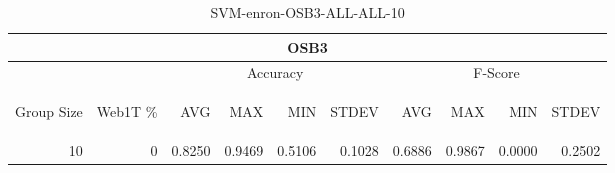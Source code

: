 \begin{center}
\begin{table}[htbp] 
 \begin{center}
\begin{tabular}{ | r | r | r | r | r | r | r | r | r | r |}
\hline
\multicolumn{10}{|c|}{OSB3}\\
\hline
 & & \multicolumn{4}{|c|}{Accuracy} & \multicolumn{4}{|c|}{F-Score}\\ \cline{3-10}
\begin{sideways}Group Size\end{sideways} & \begin{sideways}Web1T \%\end{sideways} & \begin{sideways}AVG\end{sideways} & \begin{sideways}MAX\end{sideways} & \begin{sideways}MIN\end{sideways} & \begin{sideways}STDEV\end{sideways} & \begin{sideways}AVG\end{sideways} & \begin{sideways}MAX\end{sideways} & \begin{sideways}MIN\end{sideways} & \begin{sideways}STDEV\end{sideways}\\
\hline
\multirow{0}{*}{10}
 & 0 & 0.8250 & 0.9469 & 0.5106 & 0.1028 & 0.6886 & 0.9867 & 0.0000 & 0.2502\\ \cline{2-10}
\hline
\end{tabular}
\caption{SVM-enron-OSB3-ALL-ALL-10}
\label{table:SVM-enron-OSB3-ALL-ALL-10}
\end{center}
 \end{table}
\end{center}

